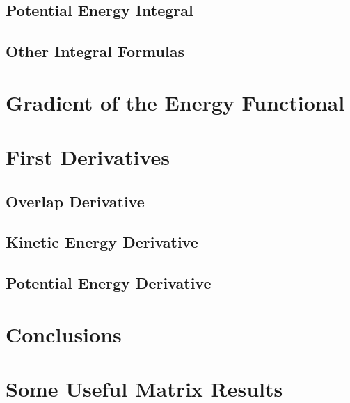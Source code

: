 \documentclass[12pt,thmsa]{article}
\begin{document}
\subsection{Potential Energy Integral}

\subsection{Other Integral Formulas}

\section{Gradient of the Energy Functional}

\section{First Derivatives}

\subsection{Overlap Derivative}

\subsection{Kinetic Energy Derivative}

\subsection{Potential Energy Derivative}

\section{Conclusions}

\appendix 

\section{Some Useful Matrix Results}
\end{document}
